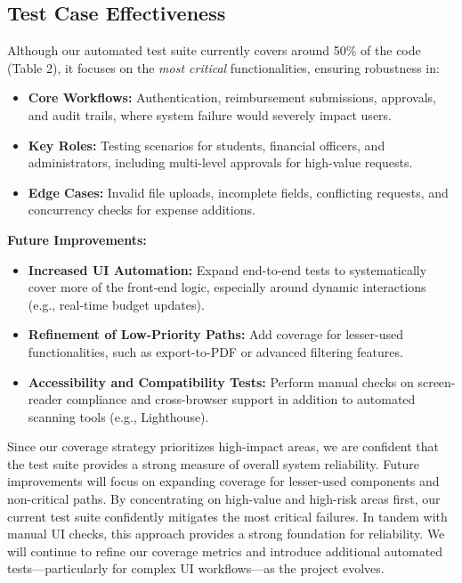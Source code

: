 \documentclass[12pt, titlepage]{article}
\begin{document}
\subsection{Test Case Effectiveness}

Although our automated test suite currently covers around 50\% of the code (Table 2),  
it focuses on the \emph{most critical} functionalities, ensuring robustness in:
\begin{itemize}
    \item \textbf{Core Workflows:} Authentication, reimbursement submissions, approvals,  
          and audit trails, where system failure would severely impact users.
    \item \textbf{Key Roles:} Testing scenarios for students, financial officers, and  
          administrators, including multi-level approvals for high-value requests.
    \item \textbf{Edge Cases:} Invalid file uploads, incomplete fields, conflicting requests,  
          and concurrency checks for expense additions.
\end{itemize}

\noindent
\textbf{Future Improvements:}
\begin{itemize}
    \item \textbf{Increased UI Automation:} Expand end-to-end tests to  
          systematically cover more of the front-end logic, especially around dynamic  
          interactions (e.g., real-time budget updates).
    \item \textbf{Refinement of Low-Priority Paths:} Add coverage for lesser-used  
          functionalities, such as export-to-PDF or advanced filtering features.
    \item \textbf{Accessibility and Compatibility Tests:} Perform manual checks on  
          screen-reader compliance and cross-browser support in addition to automated  
          scanning tools (e.g., Lighthouse).
\end{itemize}

\noindent
Since our coverage strategy prioritizes high-impact areas, we are confident that the test suite provides a strong measure of overall system reliability. Future improvements will focus on expanding coverage for lesser-used components and non-critical paths. By concentrating on high-value and high-risk areas first, our current test suite confidently  
mitigates the most critical failures. In tandem with manual UI checks, this approach provides  
a strong foundation for reliability. We will continue to refine our coverage metrics and  
introduce additional automated tests—particularly for complex UI workflows—as the  
project evolves.
\end{document}

